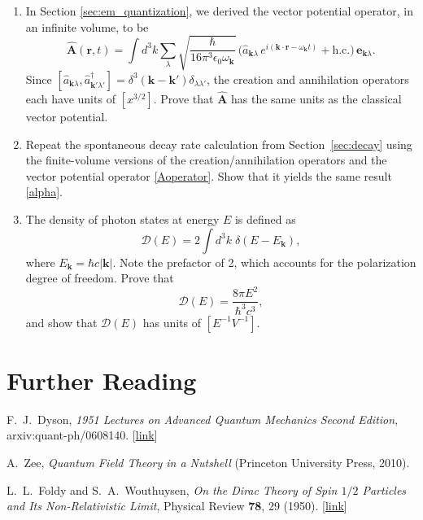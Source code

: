 \documentclass[pra,12pt]{revtex4}
\begin{document}
\begin{enumerate}
\item
  In Section \ref{sec:em_quantization}, we derived the vector
  potential operator, in an infinite volume, to be
  \begin{equation}
    \hat{\mathbf{A}}(\mathbf{r},t) = \int d^3k \sum_{\lambda} 
  \sqrt{\frac{\hbar}{16\pi^3\epsilon_0\omega_{\mathbf{k}}}}\,
  \Big(\hat{a}_{\mathbf{k}\lambda} \, e^{i(\mathbf{k}\cdot\mathbf{r} - \omega_{\mathbf{k}} t)}
  + \mathrm{h.c.}\Big)\, \mathbf{e}_{\mathbf{k}\lambda}.
  \end{equation}
  Since $[\hat{a}_{\mathbf{k}\lambda},
    \hat{a}^\dagger_{\mathbf{k}'\lambda'}] =
  \delta^3(\mathbf{k}-\mathbf{k}') \delta_{\lambda\lambda'}$, the
  creation and annihilation operators each have units of $[x^{3/2}]$.
  Prove that $\hat{\mathbf{A}}$ has the same units as the classical
  vector potential.

\item Repeat the spontaneous decay rate calculation from
  Section~\ref{sec:decay} using the finite-volume versions of the
  creation/annihilation operators and the vector potential operator
  \eqref{Aoperator}.  Show that it yields the same result
  \eqref{alpha}.
  \label{ex:alpha_finite}

\item
  The density of photon states at energy $E$ is defined as
  \begin{equation}
    \mathcal{D}(E) = 2\int d^3k\; \delta(E-E_{\mathbf{k}}),
  \end{equation}
  where $E_{\mathbf{k}} = \hbar c |\mathbf{k}|$.  Note the prefactor
  of 2, which accounts for the polarization degree of freedom.  Prove
  that
  \begin{equation}
    \mathcal{D}(E) = \frac{8\pi E^2}{\hbar^3c^3},
  \end{equation}
  and show that $\mathcal{D}(E)$ has units of $[E^{-1}V^{-1}]$.
  \label{ex:DE}

\end{enumerate}

\section*{Further Reading}

\begin{enumerate}[[1{]}]
\item F.~J.~Dyson, \textit{1951 Lectures on Advanced Quantum Mechanics
  Second Edition}, arxiv:quant-ph/0608140. [\href{https://arxiv.org/abs/quant-ph/0608140}{link}]
\label{cite:dyson}

\item A.~Zee, \textit{Quantum Field Theory in a Nutshell} (Princeton
  University Press, 2010).
\label{cite:zee}

\item L.~L.~Foldy and S.~A.~Wouthuysen, \textit{On the Dirac Theory of
  Spin $1/2$ Particles and Its Non-Relativistic Limit}, Physical
  Review \textbf{78}, 29 (1950). [\href{https://journals.aps.org/pr/abstract/10.1103/PhysRev.78.29}{link}]
\label{cite:foldy}
\end{enumerate}
\end{document}
